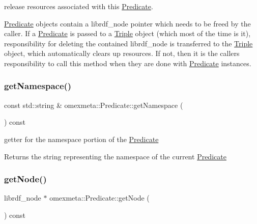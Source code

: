 release resources associated with this \hyperlink{classomexmeta_1_1Predicate}{Predicate}. 

\hyperlink{classomexmeta_1_1Predicate}{Predicate} objects contain a librdf\+\_\+node pointer which needs to be freed by the caller. If a \hyperlink{classomexmeta_1_1Predicate}{Predicate} is passed to a \hyperlink{classomexmeta_1_1Triple}{Triple} object (which most of the time is it), responsibility for deleting the contained librdf\+\_\+node is transferred to the \hyperlink{classomexmeta_1_1Triple}{Triple} object, which automatically clears up resources. If not, then it is the callers responsibility to call this method when they are done with \hyperlink{classomexmeta_1_1Predicate}{Predicate} instances. \mbox{\label{classomexmeta_1_1Predicate_add4ab1cd86f83de3512279bbfdad947c}} 
\subsubsection{\texorpdfstring{get\+Namespace()}{getNamespace()}}
{\footnotesize\ttfamily const std\+::string \& omexmeta\+::\+Predicate\+::get\+Namespace (\begin{DoxyParamCaption}{ }\end{DoxyParamCaption}) const}



getter for the namespace portion of the \hyperlink{classomexmeta_1_1Predicate}{Predicate} 

\begin{DoxyReturn}{Returns}
the string representing the namespace of the current \hyperlink{classomexmeta_1_1Predicate}{Predicate} 
\end{DoxyReturn}
\mbox{\label{classomexmeta_1_1Predicate_a144efc75a923b9d85b9f8eaccf0400bb}} 
\subsubsection{\texorpdfstring{get\+Node()}{getNode()}}
{\footnotesize\ttfamily librdf\+\_\+node $\ast$ omexmeta\+::\+Predicate\+::get\+Node (\begin{DoxyParamCaption}{ }\end{DoxyParamCaption}) const}



